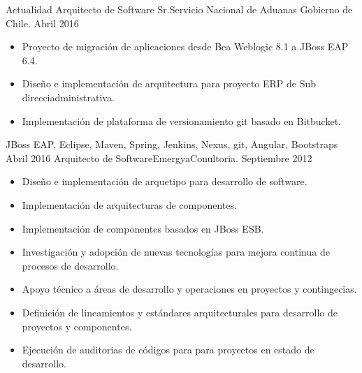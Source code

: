 %
%
%
\begin{experiences}
  \experience
    {Actualidad} {Arquitecto de Software Sr.}{Servicio Nacional de Aduanas}{ Gobierno de Chile.}
    {Abril 2016} {
                      \begin{itemize}
                        \item Proyecto de migraci\'on de aplicaciones desde Bea Weblogic 8.1 a JBoss EAP 6.4.
                        \item Diseño e implementaci\'on de arquitectura para proyecto ERP de Sub direcci\on administrativa.
                        \item Implementaci\'on de plataforma de versionamiento git basado en Bitbucket.
                      \end{itemize}
                    }
                    {JBoss EAP,  Eclipse, Maven, Spring, Jenkins, Nexus, git, Angular, Bootstraps}
  \emptySeparator
  \experience
    {Abril 2016} {Arquitecto de Software}{Emergya}{Conultoria.}
    {Septiembre 2012}    {
                      \begin{itemize}
                        \item Diseño e implementaci\'on de arquetipo para desarrollo de software.
                        \item Implementaci\'on de arquitecturas de componentes.
                        \item Implementaci\'on de componentes basados en JBoss ESB.
                        \item Investigaci\'on y adopci\'on de nuevas tecnolog\'ias para mejora continua de procesos de desarrollo.
                        \item Apoyo t\'ecnico a \'areas de desarrollo y operaciones en proyectos  y contingecias.
                        \item Definici\'on de lineamientos y est\'andares arquitecturales para desarrollo de proyectos y componentes.
                        \item Ejecuci\'on de auditorias de c\'odigos para para proyectos en estado de desarrollo.
                      \end{itemize}
}
\end{experiences}
